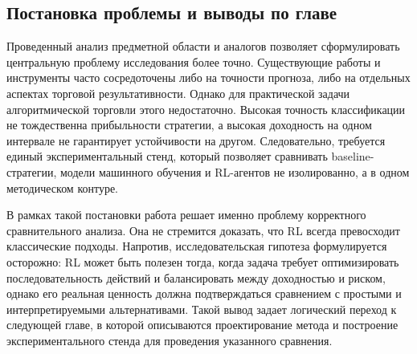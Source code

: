 \subsection{Постановка проблемы и выводы по главе}

Проведенный анализ предметной области и аналогов позволяет сформулировать центральную проблему исследования более точно. Существующие работы и инструменты часто сосредоточены либо на точности прогноза, либо на отдельных аспектах торговой результативности. Однако для практической задачи алгоритмической торговли этого недостаточно. Высокая точность классификации не тождественна прибыльности стратегии, а высокая доходность на одном интервале не гарантирует устойчивости на другом. Следовательно, требуется единый экспериментальный стенд, который позволяет сравнивать baseline-стратегии, модели машинного обучения и RL-агентов не изолированно, а в одном методическом контуре.

В рамках такой постановки работа решает именно проблему корректного сравнительного анализа. Она не стремится доказать, что RL всегда превосходит классические подходы. Напротив, исследовательская гипотеза формулируется осторожно: RL может быть полезен тогда, когда задача требует оптимизировать последовательность действий и балансировать между доходностью и риском, однако его реальная ценность должна подтверждаться сравнением с простыми и интерпретируемыми альтернативами. Такой вывод задает логический переход к следующей главе, в которой описываются проектирование метода и построение экспериментального стенда для проведения указанного сравнения.
